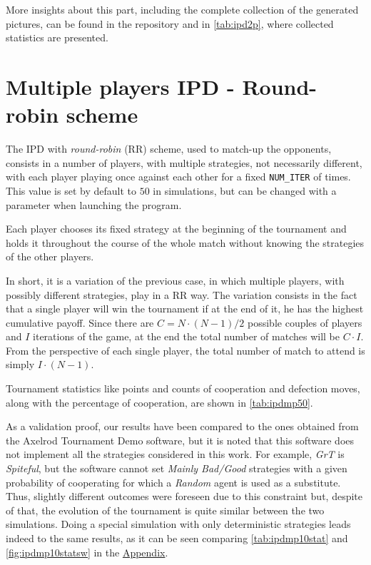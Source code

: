 \documentclass[journal,10pt,twoside]{IEEEtran}
\begin{document}
More insights about this part, including the complete collection of the generated pictures, can be found in the repository and in \autoref{tab:ipd2p}, where collected statistics are presented.

\section{Multiple players IPD - Round-robin scheme} \label{s:IPDMP}
The IPD with \textit{round-robin} (RR) scheme, used to match-up the opponents, consists in a number of players, with multiple strategies, not necessarily different, with each player playing once against each other for a fixed \texttt{NUM\_ITER} of times. This value is set by default to $50$ in simulations, but can be changed with a parameter when launching the program.

Each player chooses its fixed strategy at the beginning of the tournament and holds it throughout the course of the whole match without knowing the strategies of the other players.

In short, it is a variation of the previous case, in which multiple players, with possibly different strategies, play in a RR way. The variation consists in the fact that a single player will win the tournament if at the end of it, he has the highest cumulative payoff.
Since there are $C=N\cdot (N-1)/2$ possible couples of players and $I$ iterations of the game, at the end the total number of matches will be $C\cdot I$. From the perspective of each single player, the total number of match to attend is simply $I\cdot(N-1)$.

Tournament statistics like points and counts of cooperation and defection moves, along with the percentage of cooperation, are shown in \autoref{tab:ipdmp50}.

As a validation proof, our results have been compared to the ones obtained from the Axelrod Tournament Demo software, \cite{demosw} but it is noted that this software does not implement all the strategies considered in this work. For example, \textit{GrT} is \textit{Spiteful}, but the software cannot set \textit{Mainly Bad/Good} strategies with a given probability of cooperating for which a \textit{Random} agent is used as a substitute. Thus, slightly different outcomes were foreseen due to this constraint but, despite of that, the evolution of the tournament is quite similar between the two simulations.
Doing a special simulation with only deterministic strategies leads indeed to the same results, as it can be seen comparing \autoref{tab:ipdmp10stat} and \autoref{fig:ipdmp10statsw} in the \hyperref[s:appendix]{Appendix}.
\end{document}
